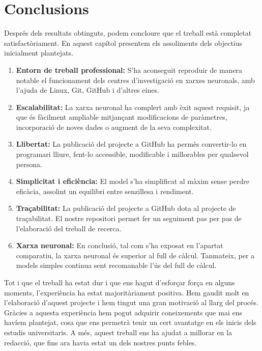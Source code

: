 \chapter{Conclusions}

\label{c:conclusions}

Després dels resultats obtinguts, podem concloure que el treball està completat satisfactòriament. En aquest capítol presentem els assoliments dels objectius inicialment plantejats.

\begin{enumerate}

     \item \textbf{Entorn de treball professional:} S’ha aconseguit reproduir de manera notable el funcionament dels centres d’investigació en xarxes neuronals, amb l'ajuda de Linux, Git, GitHub i d'altres eines.

     \item \textbf{Escalabilitat:} La xarxa neuronal ha complert amb èxit aquest requisit, ja que és fàcilment ampliable mitjançant modificacions de paràmetres, incorporació de noves dades o augment de la seva complexitat.

     \item \textbf{Llibertat:} La publicació del projecte a GitHub ha permès convertir-lo en programari lliure, fent-lo accessible, modificable i millorables per qualsevol persona.

     \item \textbf{Simplicitat i eficiència:} El model s’ha simplificat al màxim sense perdre eficàcia, assolint un equilibri entre senzillesa i rendiment.

     \item \textbf{Traçabilitat:} La publicació del projecte a GitHub dota al projecte de traçabilitat. El nostre repositori permet fer un seguiment pas per pas de l'elaboració del treball de recerca.

     \item \textbf{Xarxa neuronal:} En conclusió, tal com s’ha exposat en l’apartat comparatiu, la xarxa neuronal és superior al full de càlcul. Tanmateix, per a models simples continua sent recomanable l’ús del full de càlcul.

\end{enumerate}

Tot i que el treball ha estat dur i que ens hagut d'esforçar força en alguns moments, l’experiència ha estat majoritàriament positiva. Hem gaudit molt en l’elaboració d’aquest projecte i hem tingut una gran motivació al llarg del procés. Gràcies a aquesta experiència hem pogut adquirir coneixements que mai ens havíem plantejat, cosa que ens permetrà tenir un cert avantatge en els inicis dels estudis universitaris. A més, aquest treball ens ha ajudat a millorar en la redacció, que fins ara havia estat un dels nostres punts febles.

